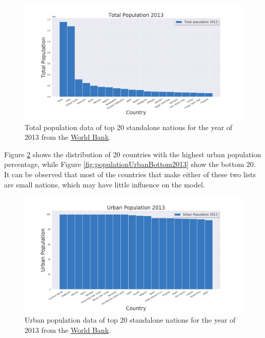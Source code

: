 \documentclass[11pt,a4paper,titlepage]{article}
\begin{document}
\begin{figure}[!htbp]
    \begin{center}
        \includegraphics[width=\textwidth]{../Plots/populationTotal_2013.png}
        \caption{Total population data of top 20 standalone nations for the year of 2013 from the \href{https://www.worldbank.org/}{World Bank}.}
        \label{fig:populationTotal2013}
    \end{center}
\end{figure}

Figure \ref{fig:populationUrban2013} shows the distribution of 20 countries with the highest urban population percentage, while Figure \ref{fig:populationUrbanBottom2013} show the bottom 20. It can be observed that most of the countries that make either of these two lists are small nations, which may have little influence on the model.

\begin{figure}[!htbp]
    \begin{center}
        \includegraphics[width=\textwidth]{../Plots/populationUrban_2013.png}
        \caption{Urban population data of top 20 standalone nations for the year of 2013 from the \href{https://www.worldbank.org/}{World Bank}.}
        \label{fig:populationUrban2013}
    \end{center}
\end{figure}
\end{document}
